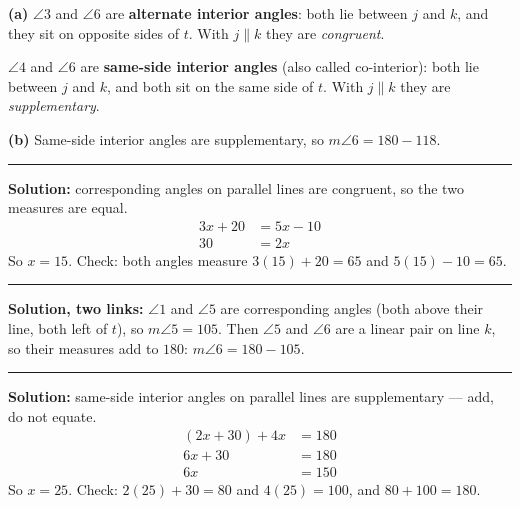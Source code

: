 \documentclass[12pt]{article}
\begin{document}



\textbf{(a)} $\angle 3$ and $\angle 6$ are \textbf{alternate interior angles}: both lie between $j$ and $k$, and they sit on opposite sides of $t$. With $j \parallel k$ they are \emph{congruent}.

$\angle 4$ and $\angle 6$ are \textbf{same-side interior angles} (also called co-interior): both lie between $j$ and $k$, and both sit on the same side of $t$. With $j \parallel k$ they are \emph{supplementary}.

\textbf{(b)} Same-side interior angles are supplementary, so $m\angle 6 = 180 - 118$. 

\vspace{0.2cm}\noindent\rule{\linewidth}{0.2pt}


\textbf{Solution:} corresponding angles on parallel lines are congruent, so the two measures are equal.
\begin{align*}
  3x + 20 &= 5x - 10 \\
  30 &= 2x
\end{align*}
So $x = 15$. Check: both angles measure $3(15) + 20 = 65$ and $5(15) - 10 = 65$. 

\vspace{0.2cm}\noindent\rule{\linewidth}{0.2pt}


\textbf{Solution, two links:} $\angle 1$ and $\angle 5$ are corresponding angles (both above their line, both left of $t$), so $m\angle 5 = 105$. Then $\angle 5$ and $\angle 6$ are a linear pair on line $k$, so their measures add to $180$: $m\angle 6 = 180 - 105$. 

\vspace{0.2cm}\noindent\rule{\linewidth}{0.2pt}


\textbf{Solution:} same-side interior angles on parallel lines are supplementary --- add, do not equate.
\begin{align*}
  (2x + 30) + 4x &= 180 \\
  6x + 30 &= 180 \\
  6x &= 150
\end{align*}
So $x = 25$. Check: $2(25) + 30 = 80$ and $4(25) = 100$, and $80 + 100 = 180$. 
\end{document}
